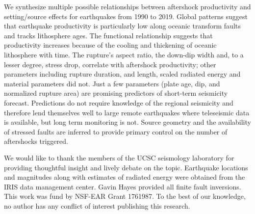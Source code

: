 \documentclass[draft, jgrga]{agujournal2018}
\begin{document}
We synthesize multiple possible relationships between aftershock productivity and setting/source effects for earthquakes from 1990 to 2019. Global patterns suggest that earthquake productivity is particularly low along oceanic transform faults and tracks lithosphere ages. The functional relationship suggests that productivity increases because of the cooling and thickening of oceanic lithosphere with time. The rupture's aspect ratio, the down-dip width and, to a lesser degree, stress drop, correlate with aftershock productivity; other parameters including rupture duration, and length, scaled radiated energy and material parameters did not. Just a few parameters (plate age, dip, and normalized rupture area) are promising predictors of short-term seismicity forecast. Predictions do not require knowledge of the regional seismicity and therefore lend themselves well to large remote earthquakes where teleseismic data is available, but long term monitoring is not. Source geometry and the availability of stressed faults are inferred to provide primary control on the number of aftershocks triggered.

\acknowledgments
We would like to thank the members of the UCSC seismology laboratory for providing thoughtful insight and lively debate on the topic. Earthquake locations and magnitudes along with estimates of radiated energy were obtained from the IRIS data management center. Gavin Hayes provided all finite fault inversions. This work was fund by NSF-EAR Grant 1761987. To the best of our knowledge, no author has any conflict of interest publishing this research. 


\end{document}
